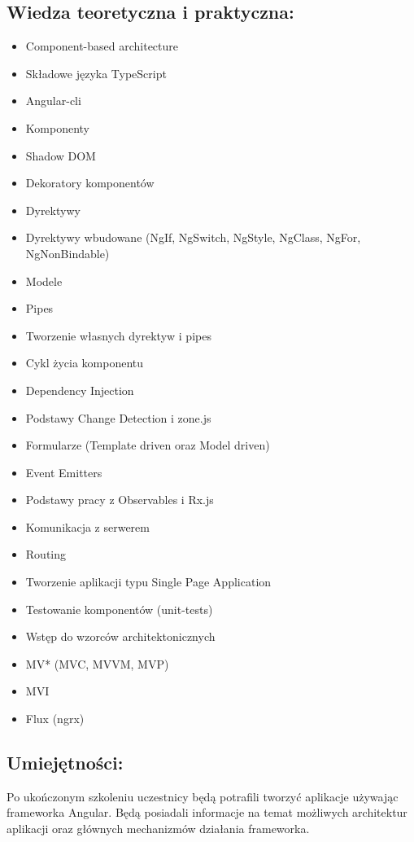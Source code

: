 \documentclass{article}[10pt]
\begin{document}
	\subsection*{Wiedza teoretyczna i praktyczna:}
\begin{adjustwidth}{1.5cm}{}
	\begin{itemize}
		\item Component-based architecture
		\item Składowe języka TypeScript
		\item Angular-cli
		\item Komponenty
		\item Shadow DOM
		\item Dekoratory komponentów
		\item Dyrektywy
		\item Dyrektywy wbudowane (NgIf, NgSwitch, NgStyle, NgClass, NgFor, NgNonBindable)
		\item Modele
		\item Pipes
		\item Tworzenie własnych dyrektyw i pipes
		\item Cykl życia komponentu
		\item Dependency Injection
		\item Podstawy Change Detection i zone.js
		\item Formularze (Template driven oraz Model driven)
		\item Event Emitters
		\item Podstawy pracy z Observables i Rx.js
		\item Komunikacja z serwerem
		\item Routing
		\item Tworzenie aplikacji typu Single Page Application
		\item Testowanie komponentów (unit-tests)
		\item Wstęp do wzorców architektonicznych
		\item MV* (MVC, MVVM, MVP)
		\item MVI
		\item Flux (ngrx)
	\end{itemize}
\end{adjustwidth}

	\subsection*{Umiejętności:}
\begin{adjustwidth}{2cm}{}
\justifying
	
Po ukończonym szkoleniu uczestnicy będą potrafili tworzyć aplikacje używając frameworka Angular. Będą posiadali informacje na temat możliwych architektur aplikacji oraz głównych mechanizmów działania frameworka. 

\end{adjustwidth}
\end{document}
